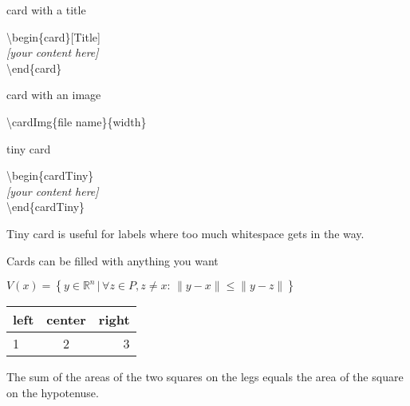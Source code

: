 \documentclass[9pt, aspectratio=169]{beamer}
\begin{document}
\begin{frame}{card with a title}
\begin{card}[Title]
\end{card}

\begin{card}
{\color{primary} \textbackslash begin\{card\}[Title]\\[2mm]}
\null\qquad \textit{[your content here]}\\[2mm]
{\color{primary} \textbackslash end\{card\}}
\end{card}
\end{frame}

\begin{frame}{card with an image}
\centering
{}

\begin{card}
{\color{primary} \textbackslash cardImg\{file name\}\{width\}}
\end{card}
\end{frame}

\begin{frame}{tiny card}
\begin{cardTiny}
\end{cardTiny}

\begin{card}
{\color{primary} \textbackslash begin\{cardTiny\}\\[2mm]}
\null\qquad \textit{[your content here]}\\[2mm]
{\color{primary} \textbackslash end\{cardTiny\}}
\end{card}
\begin{card}
Tiny card is useful for labels where too much whitespace gets in the way. 
\end{card}
\end{frame}

\begin{frame}{Cards can be filled with anything you want}

\begin{card}
\centering$V(x) = \left\{ y \in \mathbb{R}^n \,|\, \forall z \in P, z\neq x:\, \|y-x\|\leq\|y-z\| \right\}$
\end{card}

\begin{card}
\centering
\begin{tabular}{lcr}
left & center & right \\
\hline
1 & 2 & 3 \\
\end{tabular}
\end{card}

\begin{card}
\begin{theorem}[Pythagorean]
The sum of the areas of the two squares on the legs equals the area of the square on the hypotenuse.
\end{theorem}
\end{card}
\end{frame}
\end{document}
